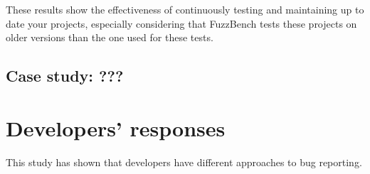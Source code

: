 These results show the effectiveness of continuously testing and maintaining up to date your projects, especially considering that FuzzBench tests these projects on older versions than the one used for these tests. 







\newpage
\subsection{Case study: ???}





\newpage
\section{Developers' responses}
This study has shown that developers have different approaches to bug reporting. 

